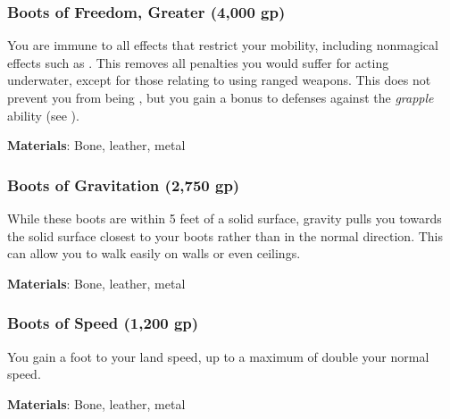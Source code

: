 \lowercase{\hypertarget{item:Boots of Freedom, Greater}{}}\label{item:Boots of Freedom, Greater}
\hypertarget{item:Boots of Freedom, Greater}{\subsubsection{Boots of Freedom, Greater\hfill{} (4,000 gp)}}

You are immune to all effects that restrict your mobility, including nonmagical effects such as .
This removes all penalties you would suffer for acting underwater, except for those relating to using ranged weapons.
This does not prevent you from being \grappled, but you gain a  bonus to defenses against the \textit{grapple} ability (see ).



\vspace{0.25em}
\textbf{Materials}: Bone, leather, metal


\lowercase{\hypertarget{item:Boots of Gravitation}{}}\label{item:Boots of Gravitation}
\hypertarget{item:Boots of Gravitation}{\subsubsection{Boots of Gravitation\hfill{} (2,750 gp)}}

While these boots are within 5 feet of a solid surface, gravity pulls you towards the solid surface closest to your boots rather than in the normal direction.
This can allow you to walk easily on walls or even ceilings.



\vspace{0.25em}
\textbf{Materials}: Bone, leather, metal


\lowercase{\hypertarget{item:Boots of Speed}{}}\label{item:Boots of Speed}
\hypertarget{item:Boots of Speed}{\subsubsection{Boots of Speed\hfill{} (1,200 gp)}}

You gain a  foot  to your land speed, up to a maximum of double your normal speed.



\vspace{0.25em}
\textbf{Materials}: Bone, leather, metal



